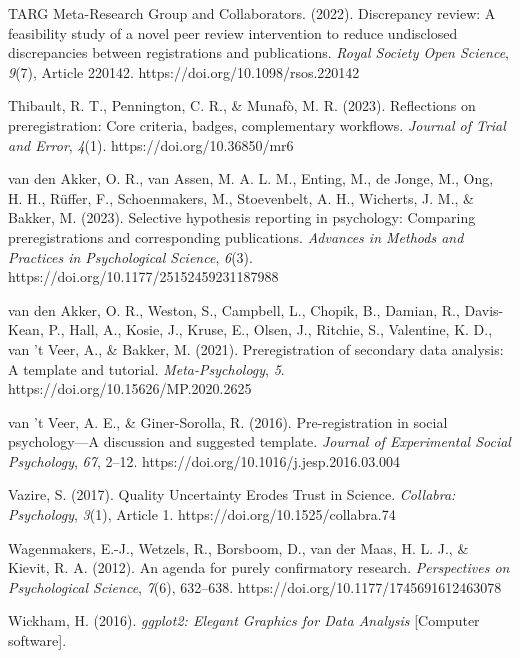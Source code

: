 \documentclass[authordate, empirical]{jote-new-article}
\begin{document}
	TARG Meta-Research Group and Collaborators. (2022). Discrepancy review: A feasibility study of a novel peer review intervention to reduce undisclosed discrepancies between registrations and publications. \emph{Royal Society Open Science}, \emph{9}(7), Article 220142. https://doi.org/10.1098/rsos.220142



	Thibault, R. T., Pennington, C. R., \& Munafò, M. R. (2023). Reflections on preregistration: Core criteria, badges, complementary workflows. \emph{Journal of Trial and Error}, \emph{4}(1). https://doi.org/10.36850/mr6



	van den Akker, O. R., van Assen, M. A. L. M., Enting, M., de Jonge, M., Ong, H. H., Rüffer, F., Schoenmakers, M., Stoevenbelt, A. H., Wicherts, J. M., \& Bakker, M. (2023). Selective hypothesis reporting in psychology: Comparing preregistrations and corresponding publications. \emph{Advances in Methods and Practices in Psychological Science}, \emph{6}(3). https://doi.org/10.1177/25152459231187988



	van den Akker, O. R., Weston, S., Campbell, L., Chopik, B., Damian, R., Davis-Kean, P., Hall, A., Kosie, J., Kruse, E., Olsen, J., Ritchie, S., Valentine, K. D., van 't Veer, A., \& Bakker, M. (2021). Preregistration of secondary data analysis: A template and tutorial. \emph{Meta-Psychology}, \emph{5}. https://doi.org/10.15626/MP.2020.2625



	van 't Veer, A. E., \& Giner-Sorolla, R. (2016). Pre-registration in social psychology—A discussion and suggested template. \emph{Journal of Experimental Social Psychology}, \emph{67}, 2--12. https://doi.org/10.1016/j.jesp.2016.03.004



	Vazire, S. (2017). Quality Uncertainty Erodes Trust in Science. \emph{Collabra: Psychology}, \emph{3}(1), Article 1. https://doi.org/10.1525/collabra.74



	Wagenmakers, E.-J., Wetzels, R., Borsboom, D., van der Maas, H. L. J., \& Kievit, R. A. (2012). An agenda for purely confirmatory research. \emph{Perspectives on Psychological Science}, \emph{7}(6), 632--638. https://doi.org/10.1177/1745691612463078



	Wickham, H. (2016). \emph{ggplot2: Elegant Graphics for Data Analysis} [Computer software].
\end{document}
